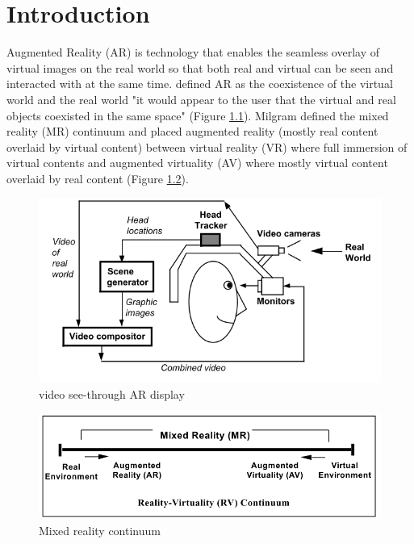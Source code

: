 \chapter{Introduction} %
\label{ch:intro} %

Augmented Reality (AR) is technology that enables the seamless overlay of virtual images on the real world so that both real and virtual can be seen and interacted with at the same time. \cite{azuma1997survey} defined AR as the coexistence of the virtual world and the real world "it would appear to the user that the virtual and real objects coexisted in the same space" (Figure \ref{fig:video-see-through}). Milgram \cite{Milgram1995a} defined the mixed reality (MR) continuum and placed augmented reality (mostly real content overlaid by virtual content) between virtual reality (VR) where full immersion of virtual contents and augmented virtuality (AV) where mostly virtual content overlaid by real content (Figure \ref{fig:mr-continuum}). 

\begin{figure}
    \centering
    \includegraphics[width=.8\linewidth]{images/video-see-through-ar.png}
    \caption{video see-through AR display}
    \label{fig:video-see-through}
\end{figure}

\begin{figure}
    \centering
    \includegraphics[width=.8\linewidth]{images/mixed-reality-continuum.png}
    \caption{Mixed reality continuum}
    \label{fig:mr-continuum}
\end{figure}

